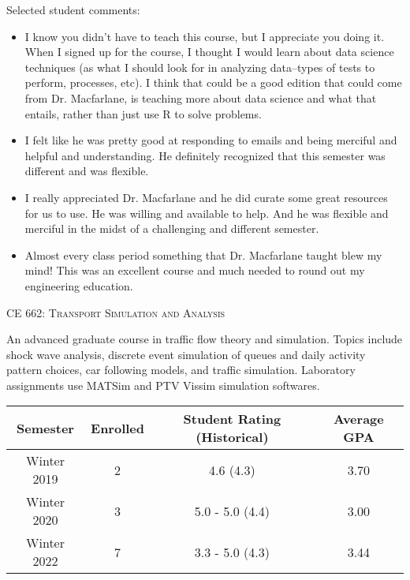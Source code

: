 \documentclass[margin,line]{res}
\newif\ifdetail
\newcommand{\acc}{\scshape }
\begin{document}
\begin{resume}
Selected student comments:
\begin{itemize}
  \item I know you didn't have to teach this course, but I appreciate you doing it.
    When I signed up for the course, I thought I would learn about data science
    techniques (as what I should look for in analyzing data--types of tests to
    perform, processes, etc). I think that could be a good edition that could
    come from Dr. Macfarlane, is teaching more about data science and what that
    entails, rather than just use R to solve problems.
    \item I felt like he was pretty good at responding to emails and being merciful and helpful and understanding. He definitely recognized that this semester was different and was flexible.
    \item I really appreciated Dr. Macfarlane and he did curate some great resources for us to use. He was willing and available to help. And he was flexible and merciful in the midst of a challenging and different semester.
    \item Almost every class period something that Dr. Macfarlane taught blew my mind! This was an excellent course and much needed to round out my engineering education.
\end{itemize}

\fi



\vspace{.4cm}
{\acc CE 662: Transport Simulation and Analysis}

\vspace{-.4cm}
An advanced graduate course in traffic flow theory and simulation. Topics
include shock wave analysis, discrete event simulation of queues and daily
activity pattern choices, car following models, and traffic simulation.
Laboratory assignments use MATSim and PTV Vissim simulation softwares.


\ifdetail
\begin{tabular}{cccc}
  \toprule
  Semester & Enrolled & Student Rating (Historical) & Average GPA\\
  \midrule
  Winter 2019 & 2 & 4.6 (4.3) & 3.70 \\
  Winter 2020 & 3 & 5.0 - 5.0 (4.4) & 3.00 \\
  Winter 2022 & 7 & 3.3 - 5.0 (4.3) & 3.44 \\
  \bottomrule
\end{tabular}


\end{resume}
\end{document}
